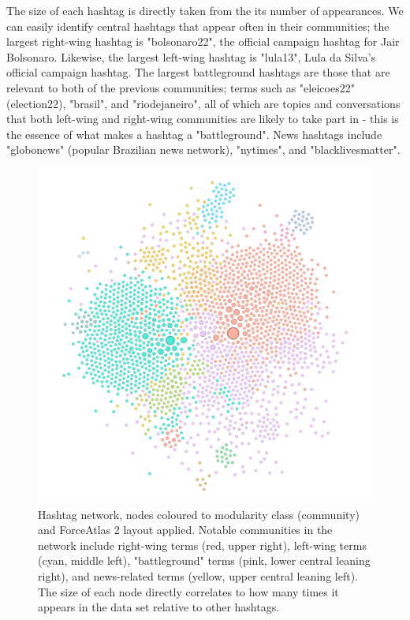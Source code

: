 \documentclass[a4paper,11pt]{article}  %
\begin{document}
	The size of each hashtag is directly taken from the its number of appearances. We can easily identify central hashtags that appear often in their communities; the largest right-wing hashtag is "bolsonaro22", the official campaign hashtag for Jair Bolsonaro. Likewise, the largest left-wing hashtag is "lula13", Lula da Silva's official campaign hashtag. The largest battleground hashtags are those that are relevant to both of the previous communities; terms such as "eleicoes22" (election22), "brasil", and "riodejaneiro", all of which are topics and conversations that both left-wing and right-wing communities are likely to take part in - this is the essence of what makes a hashtag a "battleground". News hashtags include "globonews" (popular Brazilian news network), "nytimes", and "blacklivesmatter".

	\begin{figure}%
		\centering
		\includegraphics[height=0.5\textheight]{images/net_mod_app}
		\caption{Hashtag network, nodes coloured to modularity class (community) and ForceAtlas 2 layout applied. Notable communities in the network include right-wing terms (red, upper right), left-wing terms (cyan, middle left), "battleground" terms (pink, lower central leaning right), and news-related terms (yellow, upper central leaning left). The size of each node directly correlates to how many times it appears in the data set relative to other hashtags.\hfill}
		\label{fig:1}
	\end{figure}
\end{document}

